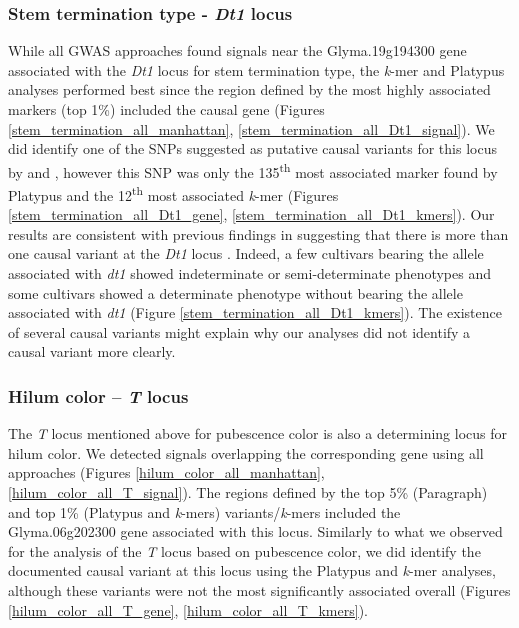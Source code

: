 \subsubsection*{Stem termination type - \textit{Dt1} locus}
\label{sv-gwas-main-results-stem-termination-dt1}

While all GWAS approaches found signals near the Glyma.19g194300 gene
associated with the \textit{Dt1} locus for stem termination type, the
\textit{k}-mer and Platypus analyses performed best since the region defined by the most highly associated markers
(top 1\%) included the causal gene (Figures
\ref{stem_termination_all_manhattan}, \ref{stem_termination_all_Dt1_signal}).
We did identify one of the SNPs suggested as putative causal variants for this
locus by \cite{tian2010} and \cite{liu2010}, however this SNP was only the
135\textsuperscript{th} most associated marker found by Platypus and the
12\textsuperscript{th} most associated \emph{k}-mer (Figures
\ref{stem_termination_all_Dt1_gene}, \ref{stem_termination_all_Dt1_kmers}).
Our results are consistent with previous findings in
suggesting that there is more than one causal variant at the \textit{Dt1} locus \citep{liu2010, tian2010}. Indeed, a
few cultivars bearing the allele associated with \emph{dt1} showed
indeterminate or semi-determinate phenotypes and some cultivars showed a
determinate phenotype without bearing the allele associated with \emph{dt1}
(Figure \ref{stem_termination_all_Dt1_kmers}). The existence of several causal
variants might explain why our analyses did not identify a causal variant more
clearly.

\subsubsection*{Hilum color -- \textit{T} locus}
\label{sv-gwas-main-results-hilum-color-t}

The \textit{T} locus mentioned above for pubescence color is also a determining
locus for hilum color. We detected signals overlapping the corresponding gene
using all approaches (Figures \ref{hilum_color_all_manhattan},
\ref{hilum_color_all_T_signal}). The regions defined by the top 5\% (Paragraph)
and top 1\% (Platypus and \textit{k}-mers) variants/\textit{k}-mers included
the Glyma.06g202300 gene associated with this locus. Similarly to what we
observed for the analysis of the \textit{T} locus based on pubescence color, we
did identify the documented causal variant at this locus using the Platypus and
\textit{k}-mer analyses, although these variants were not the most
significantly associated overall (Figures \ref{hilum_color_all_T_gene},
\ref{hilum_color_all_T_kmers}).

